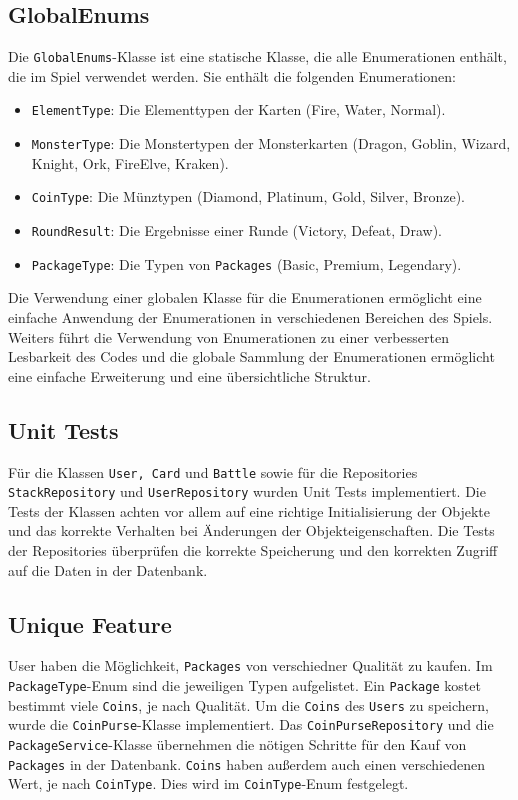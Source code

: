 \documentclass[a4paper, 12pt]{article}
\begin{document}
\subsection{GlobalEnums}
Die \texttt{GlobalEnums}-Klasse ist eine statische Klasse, die alle Enumerationen enthält, die im Spiel verwendet werden. Sie enthält die folgenden Enumerationen:
\begin{itemize}
    \item \texttt{ElementType}: Die Elementtypen der Karten (Fire, Water, Normal).
    \item \texttt{MonsterType}: Die Monstertypen der Monsterkarten (Dragon, Goblin, Wizard, Knight, Ork, FireElve, Kraken).
    \item \texttt{CoinType}: Die Münztypen (Diamond, Platinum, Gold, Silver, Bronze).
    \item \texttt{RoundResult}: Die Ergebnisse einer Runde (Victory, Defeat, Draw).
    \item \texttt{PackageType}: Die Typen von \texttt{Packages} (Basic, Premium, Legendary).
\end{itemize}
Die Verwendung einer globalen Klasse für die Enumerationen ermöglicht eine einfache Anwendung der Enumerationen in verschiedenen Bereichen des Spiels.
Weiters führt die Verwendung von Enumerationen zu einer verbesserten Lesbarkeit des Codes und die globale Sammlung der Enumerationen ermöglicht eine einfache Erweiterung und eine übersichtliche Struktur.

\subsection{Unit Tests}
Für die Klassen \texttt{User, Card} und \texttt{Battle} sowie für die Repositories \texttt{StackRepository} und \texttt{UserRepository} wurden Unit Tests implementiert.
Die Tests der Klassen achten vor allem auf eine richtige Initialisierung der Objekte und das korrekte Verhalten bei Änderungen der Objekteigenschaften. 
Die Tests der Repositories überprüfen die korrekte Speicherung und den korrekten Zugriff auf die Daten in der Datenbank.

\subsection{Unique Feature}
User haben die Möglichkeit, \texttt{Packages} von verschiedner Qualität zu kaufen. Im \texttt{PackageType}-Enum sind die jeweiligen Typen aufgelistet. Ein \texttt{Package} kostet bestimmt viele \texttt{Coins}, je nach Qualität.
Um die \texttt{Coins} des \texttt{Users} zu speichern, wurde die \texttt{CoinPurse}-Klasse implementiert. Das \texttt{CoinPurseRepository} und die \texttt{PackageService}-Klasse übernehmen die nötigen Schritte für den Kauf von \texttt{Packages} in der Datenbank.
\texttt{Coins} haben außerdem auch einen verschiedenen Wert, je nach \texttt{CoinType}. Dies wird im \texttt{CoinType}-Enum festgelegt.
\end{document}
